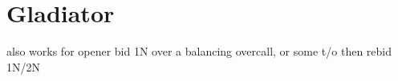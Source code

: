 \section{Gladiator}

also works for opener bid 1N over a balancing overcall, or some t/o then rebid 1N/2N

